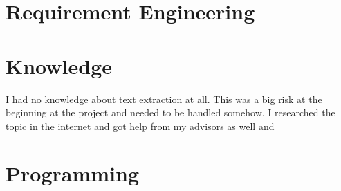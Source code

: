 \section{Requirement Engineering}



\section{Knowledge}

I had no knowledge about text extraction at all. This was a big risk at the beginning at the project and needed to be handled somehow. I researched the topic in the internet and got help from my advisors as well and 



\section{Programming}




